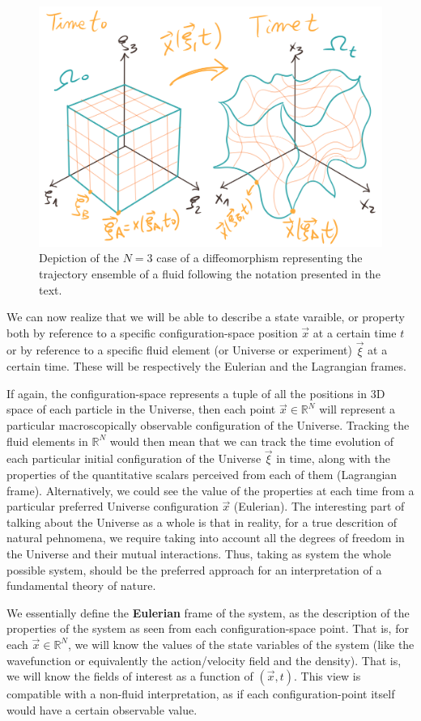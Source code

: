 \documentclass[11pt, a4paper]{article} %
\newcommand{\R}{\mathbb{R}} %
\begin{document}
\begin{figure}[h!]
  \centering
    \includegraphics[width=0.65\linewidth]{1deforma.png}
  \caption{Depiction of the $N=3$ case of a diffeomorphism representing the trajectory ensemble of a fluid following the notation presented in the text. }
  \label{fig:deform}
\end{figure}
\newpage
We can now realize that we will be able to describe a state varaible, or property both by reference to a specific configuration-space position $\vec{x}$ at a certain time $t$ or by reference to a specific fluid element (or Universe or experiment) $\vec{\xi}$ at a certain time. These will be respectively the Eulerian and the Lagrangian frames. 

If again, the configuration-space represents a tuple of all the positions in 3D space of each particle in the Universe, then each point $\vec{x}\in \R^N$ will represent a particular macroscopically observable configuration of the Universe. Tracking the fluid elements in $\R^N$ would then mean that we can track the time evolution of each particular initial configuration of the Universe $\vec{\xi}$ in time, along with the properties of the quantitative scalars perceived from each of them (Lagrangian frame). Alternatively, we could see the value of the properties at each time from a particular preferred Universe configuration $\vec{x}$ (Eulerian). The interesting part of talking about the Universe as a whole is that in reality, for a true descrition of natural pehnomena, we require taking into account all the degrees of freedom in the Universe and their mutual interactions. Thus, taking as system the whole possible system, should be the preferred approach for an interpretation of a fundamental theory of nature. 

We essentially define the {\bf Eulerian} frame of the system, as the description of the properties of the system as seen from each configuration-space point. That is, for each $\vec{x}\in\R^N$, we will know the values of the state variables of the system (like the wavefunction or equivalently the action/velocity field and the density). That is, we will know the fields of interest as a function of $(\vec{x},t)$. This view is compatible with a non-fluid interpretation, as if each configuration-point itself would have a certain observable value. 
\end{document}
